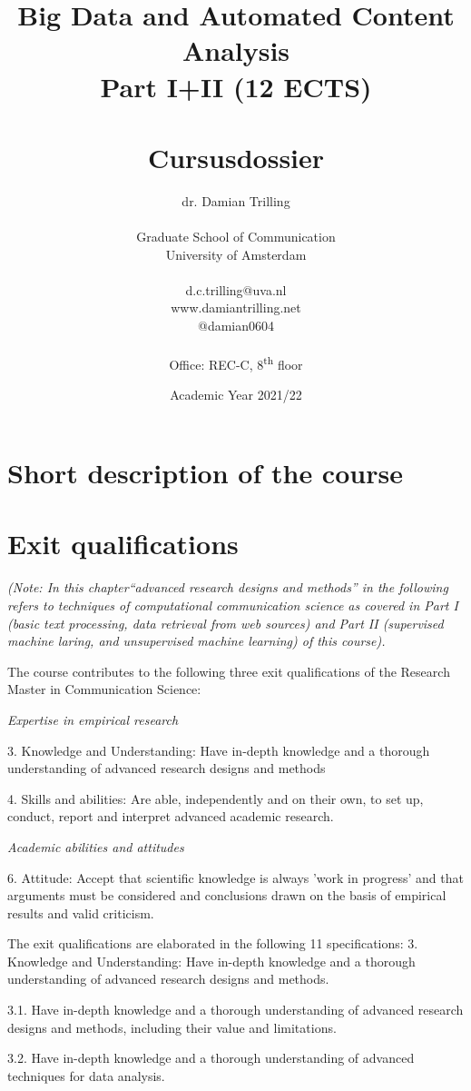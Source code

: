 \documentclass[a4paper,12pt]{report}
\title{Big Data and Automated Content Analysis\\ Part I+II (12 ECTS)\\~\\Cursusdossier}
\author{dr. Damian Trilling\\~\\Graduate School of Communication\\University of Amsterdam\\~\\d.c.trilling@uva.nl\\www.damiantrilling.net\\@damian0604\\~\\Office: REC-C, 8\textsuperscript{th} floor}
\date{Academic Year 2021/22}
\begin{document}
\maketitle

\tableofcontents


\chapter{Short description of the course}



\chapter{Exit qualifications}


\emph{(Note: In this chapter``advanced research designs and methods'' in the following refers to techniques of computational communication science as covered in Part I (basic text processing, data retrieval from web sources) and Part II (supervised machine laring, and unsupervised machine learning) of this course).}


The course contributes to the following three exit qualifications of the Research Master in Communication Science:


\textit{Expertise in empirical research}


	3.	Knowledge and Understanding: Have in-depth knowledge and a thorough understanding of advanced research designs and methods


	4.	Skills and abilities: Are able, independently and on their own, to set up, conduct, report and interpret advanced academic research.


\textit{Academic abilities and attitudes}


	6.	Attitude: Accept that scientific knowledge is always 'work in progress' and that arguments must be considered and conclusions drawn on the basis of empirical results and valid criticism.


The exit qualifications are elaborated in the following 11 specifications:
3. Knowledge and Understanding: Have in-depth knowledge and a thorough understanding of advanced research designs and methods. 


3.1. Have in-depth knowledge and a thorough understanding of advanced research designs and methods, including their value and limitations.


3.2.	Have in-depth knowledge and a thorough understanding of advanced techniques for data analysis.
\end{document}
